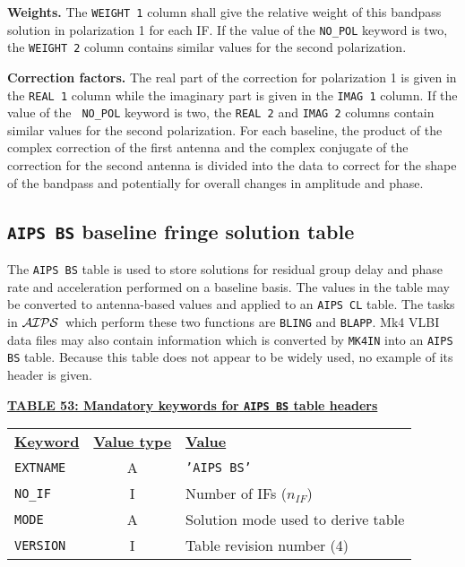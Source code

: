 \documentclass[twoside]{article}
\newcommand{\AIPS}{{$\cal AIPS\/$}}
\newcommand{\nif}{$n_{IF}$}
\begin{document}
{\bf Weights.} The {\tt WEIGHT 1} column shall give the relative weight
of this bandpass solution in polarization 1 for each IF\@.  If the
value of the {\tt NO\_POL} keyword is two, the {\tt WEIGHT 2} column
contains similar values for the second polarization.

{\bf Correction factors.}  The real part of the correction for
polarization 1 is given in the {\tt REAL 1} column while the imaginary
part is given in the {\tt IMAG 1} column.  If the value of the {\tt
  NO\_POL} keyword is two, the {\tt REAL 2} and {\tt IMAG 2} columns
contain similar values for the second polarization.  For each
baseline, the product of the complex correction of the first antenna
and the complex conjugate of the correction for the second antenna
is divided into the data to correct for the shape of the bandpass and
potentially for overall changes in amplitude and phase.

\subsection{{\tt AIPS BS} baseline fringe solution table}
\label{s:BS}

The {\tt AIPS BS} table is used to store solutions for residual group
delay and phase rate and acceleration performed on a baseline basis.
The values in the table may be converted to antenna-based values and
applied to an {\tt AIPS CL} table.  The tasks in \AIPS\ which perform
these two functions are {\tt BLING} and {\tt BLAPP}\@.  Mk4 VLBI data
files may also contain information which is converted by {\tt MK4IN}
into an {\tt AIPS BS} table.  Because this table does not appear to be
widely used, no example of its header is given.

\begin{center}
\underline{\bf{TABLE 53: Mandatory keywords for {\tt AIPS BS} table
    headers}}\\
\begin{tabular}{lcl}
\noalign{\vspace{2pt}} \label{ta:BSkeys}
\underline{{\bf Keyword}} & \underline{\bf{Value type}} &
    \underline{\bf{Value\vphantom{y}}} \\
\noalign{\vspace{2pt}}
{\tt EXTNAME}  & A & {\tt 'AIPS BS'}  \\
{\tt NO\_IF}   & I & Number of IFs (\nif)\\
{\tt MODE}     & A & Solution mode used to derive table \\
{\tt VERSION}  & I & Table revision number (4)
\end{tabular}
\end{center}
\end{document}
